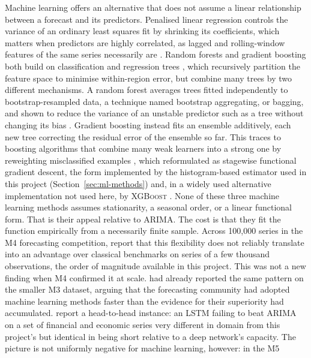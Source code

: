\documentclass[12pt,a4paper]{report}
\begin{document}
Machine learning offers an alternative that does not assume a linear
relationship between a forecast and its predictors. Penalised linear
regression controls the variance of an ordinary least squares fit by
shrinking its coefficients, which matters when predictors are highly
correlated, as lagged and rolling-window features of the same series
necessarily are \citep{hoerl1970ridge}. Random forests and gradient boosting
both build on classification and regression trees \citep{breiman1984cart},
which recursively partition the feature space to minimise within-region
error, but combine many trees by two different mechanisms. A random forest
averages trees fitted independently to bootstrap-resampled data, a technique
named bootstrap aggregating, or bagging, and shown to reduce the variance of
an unstable predictor such as a tree without changing its bias
\citep{breiman1996bagging,breiman2001random}. Gradient boosting instead
fits an ensemble additively, each new tree correcting the residual error of
the ensemble so far. This traces to boosting algorithms that combine many
weak learners into a strong one by reweighting misclassified examples
\citep{freund1997adaboost}, which \citet{friedman2001gradient} reformulated
as stagewise functional gradient descent, the form implemented by the
histogram-based estimator used in this project (Section~\ref{sec:ml-methods})
and, in a widely used alternative implementation not used here, by
\textsc{XGBoost} \citep{chen2016xgboost}. None of these three machine
learning methods assumes stationarity, a seasonal order, or a linear
functional form. That is their appeal relative to ARIMA. The cost is that
they fit the function empirically from a necessarily finite sample. Across
100{,}000 series in the M4 forecasting competition, \citet{makridakis2020m4}
report that this flexibility does not reliably translate into an advantage
over classical benchmarks on series of a few thousand observations, the
order of magnitude available in this project. This was not a new finding
when M4 confirmed it at scale. \citet{makridakis2018statistical} had already
reported the same pattern on the smaller M3 dataset, arguing that the
forecasting community had adopted machine learning methods faster than the
evidence for their superiority had accumulated. \citet{siaminamini2018comparison}
report a head-to-head instance: an LSTM failing to beat ARIMA on a set of
financial and economic series very different in domain from this project's
but identical in being short relative to a deep network's capacity. The
picture is not uniformly negative for machine learning, however: in the M5
\end{document}
